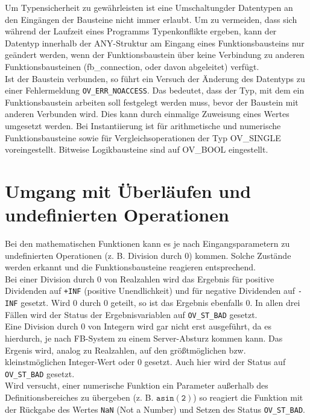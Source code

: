 Um Typensicherheit zu gewährleisten ist eine \glqq Umschaltung\grqq der Datentypen an den Eingängen der Bausteine nicht immer erlaubt. Um zu vermeiden, dass sich während der Laufzeit eines Programms Typenkonflikte ergeben, kann der Datentyp innerhalb der ANY-Struktur am Eingang eines Funktionsbausteins nur geändert werden, wenn der Funktionsbaustein über keine Verbindung zu anderen Funktionsbausteinen (fb\_connection, oder davon abgeleitet) verfügt.\\
Ist der Baustein verbunden, so führt ein Versuch der Änderung des Datentyps zu einer Fehlermeldung \texttt{OV\_ERR\_NOACCESS}. Das bedeutet, dass der Typ, mit dem ein Funktionsbaustein arbeiten soll festgelegt werden muss, bevor der Baustein mit anderen Verbunden wird. Dies kann durch einmalige Zuweisung eines Wertes umgesetzt werden. Bei Instantiierung ist für arithmetische und numerische Funktionsbausteine sowie für Vergleichsoperationen der Typ OV\_SINGLE voreingestellt. Bitweise Logikbausteine sind auf OV\_BOOL eingestellt.\\


	


\section{Umgang mit Überläufen und undefinierten Operationen \label{CHAP_Reactions}}

Bei den mathematischen Funktionen kann es je nach Eingangsparametern zu undefinierten Operationen (z. B. Division durch 0) kommen. Solche Zustände werden erkannt und die Funktionsbausteine reagieren entsprechend.\\

Bei einer Division durch 0 von Realzahlen wird das Ergebnis für positive Dividenden auf \texttt{+INF} (positive Unendlichkeit) und für negative Dividenden auf \texttt{-INF} gesetzt. Wird 0 durch 0 geteilt, so ist das Ergebnis ebenfalls 0. In allen drei Fällen wird der Status der Ergebnisvariablen auf \texttt{OV\_ST\_BAD} gesetzt.\\
Eine Division durch 0 von Integern wird gar nicht erst ausgeführt, da es hierdurch, je nach FB-System zu einem Server-Absturz kommen kann. Das Ergenis wird, analog zu Realzahlen, auf den größtmöglichen bzw. kleinstmöglichen Integer-Wert oder 0 gesetzt. Auch hier wird der Status auf \texttt{OV\_ST\_BAD} gesetzt.\\

Wird versucht, einer numerische Funktion ein Parameter außerhalb des Definitionsbereiches zu übergeben (z. B. $\mathtt{asin(2)}$) so reagiert die Funktion mit der Rückgabe des Wertes \texttt{NaN} (Not a Number) und Setzen des Status \texttt{OV\_ST\_BAD}.\\

